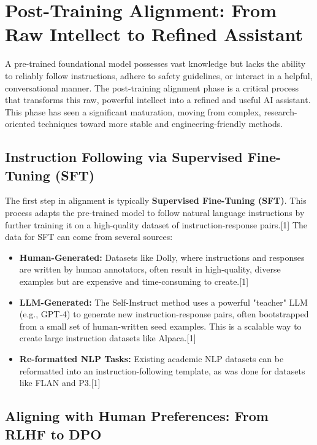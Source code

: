 \documentclass[12pt, a4paper]{article}
\begin{document}
\section{Post-Training Alignment: From Raw Intellect to Refined Assistant}

A pre-trained foundational model possesses vast knowledge but lacks the ability to reliably follow instructions, adhere to safety guidelines, or interact in a helpful, conversational manner. The post-training alignment phase is a critical process that transforms this raw, powerful intellect into a refined and useful AI assistant. This phase has seen a significant maturation, moving from complex, research-oriented techniques toward more stable and engineering-friendly methods.

\subsection{Instruction Following via Supervised Fine-Tuning (SFT)}

The first step in alignment is typically \textbf{Supervised Fine-Tuning (SFT)}. This process adapts the pre-trained model to follow natural language instructions by further training it on a high-quality dataset of instruction-response pairs.[1] The data for SFT can come from several sources:

\begin{itemize}
    \item \textbf{Human-Generated:} Datasets like Dolly, where instructions and responses are written by human annotators, often result in high-quality, diverse examples but are expensive and time-consuming to create.[1]
    \item \textbf{LLM-Generated:} The Self-Instruct method uses a powerful "teacher" LLM (e.g., GPT-4) to generate new instruction-response pairs, often bootstrapped from a small set of human-written seed examples. This is a scalable way to create large instruction datasets like Alpaca.[1]
    \item \textbf{Re-formatted NLP Tasks:} Existing academic NLP datasets can be reformatted into an instruction-following template, as was done for datasets like FLAN and P3.[1]
\end{itemize}

\subsection{Aligning with Human Preferences: From RLHF to DPO}
\end{document}
